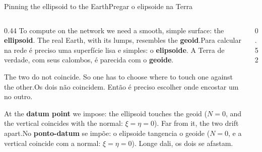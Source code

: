 \documentclass[aspectratio=169,11pt]{beamer}
\newcommand{\tr}[2]{\ifEN#2\else#1\fi}
\newcommand{\bnum}[1]{\ifmmode\textcolor{mTeal}{\mathbf{#1}}\else\textbf{\textcolor{mTeal}{#1}}\fi}
\begin{document}
\begin{frame}{\tr{Pregar o elipsoide na Terra}{Pinning the ellipsoid to the Earth}}
  \begin{columns}[T]
    \begin{column}{0.44\textwidth}
      \small
      \tr{Para calcular na rede é preciso uma superfície lisa e simples: o
      \textcolor{corSist}{\textbf{elipsoide}}. A Terra de verdade, com seus calombos, é
      parecida com o \textcolor{corMar}{\textbf{geoide}}.}{To compute on the network we need a
      smooth, simple surface: the \textcolor{corSist}{\textbf{ellipsoid}}. The real Earth, with
      its lumps, resembles the \textcolor{corMar}{\textbf{geoid}}.}
      \medskip

      \tr{Os dois não coincidem. Então é preciso escolher \alert{onde encostar} um no
      outro.}{The two do not coincide. So one has to choose \alert{where to touch} one against
      the other.}
      \medskip

      \tr{No \bnum{ponto-datum} se impõe: o elipsoide tangencia o geoide ($N=0$, e a vertical
      coincide com a normal: $\xi=\eta=0$). \alert{Longe dali, os dois se afastam.}}{At the
      \bnum{datum point} we impose: the ellipsoid touches the geoid ($N=0$, and the vertical
      coincides with the normal: $\xi=\eta=0$). \alert{Far from it, the two drift apart.}}
    \end{column}
    \begin{column}{0.52\textwidth}
      \centering
    \end{column}
  \end{columns}
\end{frame}
\end{document}
